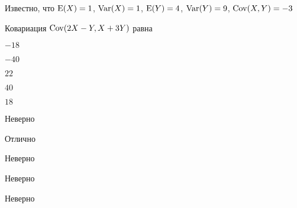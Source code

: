 
\begin{question}
Известно, что \(\operatorname{E}(X)=1\), \(\operatorname{Var}(X)=1\), \(\operatorname{E}(Y)=4\), \(\operatorname{Var}(Y)=9\),
\(\operatorname{Cov}(X,Y)=-3\)

\vspace{0.5cm}

Ковариация \(\operatorname{Cov}(2X-Y,X+3Y)\) равна
\begin{answerlist}
  \item \(-18\)
  \item \(-40\)
  \item \(22\)
  \item \(40\)
  \item \(18\)
\end{answerlist}
\end{question}

\begin{solution}
\begin{answerlist}
  \item Неверно
  \item Отлично
  \item Неверно
  \item Неверно
  \item Неверно
\end{answerlist}
\end{solution}

